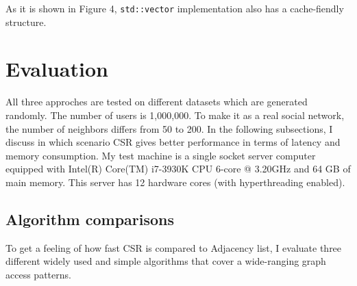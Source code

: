 \documentclass{article}
\begin{document}
As it is shown in Figure 4, \texttt{std::vector} implementation also has a cache-fiendly structure.

\section{Evaluation}
All three approches are tested on different datasets which are generated randomly. The number of users is 1,000,000. To make it as a real social network, the number of neighbors differs from 50 to 200. In the following subsections, I discuss in which scenario CSR gives better performance in terms of latency and memory consumption. My test machine is a single socket server computer equipped with Intel(R) Core(TM) i7-3930K CPU 6-core @ 3.20GHz and 64 GB of main memory. This server has 12 hardware cores (with hyperthreading enabled).

\subsection{Algorithm comparisons}
To get a feeling of how fast CSR is compared to Adjacency list, I evaluate three different widely used and simple algorithms that cover a wide-ranging graph access patterns.
\end{document}

